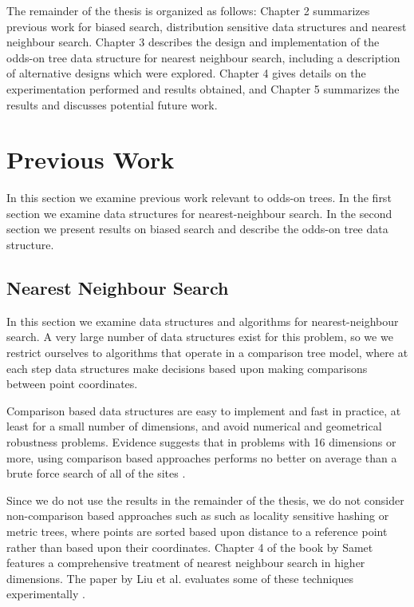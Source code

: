 \documentclass[mcs]{scsthesis}
\begin{document}
The remainder of the thesis is organized as follows: Chapter 2 summarizes
previous work for biased search, distribution sensitive data structures and
nearest neighbour search.  Chapter 3 describes the design and implementation of
the odds-on tree data structure for nearest neighbour search, including a
description of alternative designs which were explored. Chapter 4 gives details
on the experimentation performed and results obtained, and Chapter 5 summarizes
the results and discusses potential future work.

\chapter{Previous Work}

In this section we examine previous work relevant to odds-on trees. In the first
section we examine data structures for nearest-neighbour search. In the second
section we present results on biased search and describe the odds-on tree data
structure.

\section{Nearest Neighbour Search}

In this section we examine data structures and algorithms for nearest-neighbour
search. A very large number of data structures exist for this problem, so we
we restrict ourselves to algorithms that operate in a comparison tree
model, where at each step data structures make decisions based upon making
comparisons between point coordinates.

Comparison based data structures are easy to implement and fast in practice, at
least for a small number of dimensions, and avoid numerical and geometrical
robustness problems. Evidence suggests that in problems with 16 dimensions or
more, using comparison based approaches performs no better on average than a
brute force search of all of the sites \cite{fastvector}.

Since we do not use the results in the remainder of the thesis, we do not
consider non-comparison based approaches such as such as locality sensitive
hashing \cite{lsh} or metric trees, where points are sorted based upon distance
to a reference point rather than based upon their coordinates. Chapter 4 of the
book by Samet \cite{samet} features a comprehensive treatment of nearest
neighbour search in higher dimensions. The paper by Liu et al. evaluates some of
these techniques experimentally \cite{practicalann}. 
\end{document}

